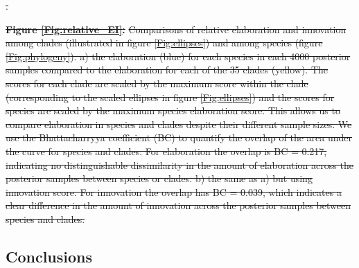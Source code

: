 \documentclass[12pt,letterpaper]{article}
\providecommand{\DIFdeltex}[1]{{\protect\color{red}\sout{#1}}}                      %
\providecommand{\DIFdelbegin}{} %
\providecommand{\DIFdelend}{} %
\providecommand{\DIFdelFL}[1]{\DIFdel{#1}} %
\providecommand{\DIFdel}[1]{\texorpdfstring{\DIFdeltex{#1}}{}} %
\newcommand{\DIFscaledelfig}{0.5}
\newlength{\DIFdelgraphicswidth} %
\newlength{\DIFdelgraphicsheight} %
\newcommand{\DIFdelincludegraphics}[2][]{%
\sbox{\DIFdelgraphicsbox}{\DIFOincludegraphics[#1]{#2}}%
\settoboxwidth{\DIFdelgraphicswidth}{\DIFdelgraphicsbox} %
\settoboxtotalheight{\DIFdelgraphicsheight}{\DIFdelgraphicsbox} %
\scalebox{\DIFscaledelfig}{%
\parbox[b]{\DIFdelgraphicswidth}{\usebox{\DIFdelgraphicsbox}\\[-\baselineskip] \rule{\DIFdelgraphicswidth}{0em}}\llap{\resizebox{\DIFdelgraphicswidth}{\DIFdelgraphicsheight}{%
\setlength{\unitlength}{\DIFdelgraphicswidth}%
\begin{picture}(1,1)%
\thicklines\linethickness{2pt} %
{\color[rgb]{1,0,0}\put(0,0){\framebox(1,1){}}}%
{\color[rgb]{1,0,0}\put(0,0){\line( 1,1){1}}}%
{\color[rgb]{1,0,0}\put(0,1){\line(1,-1){1}}}%
\end{picture}%
}\hspace*{3pt}}} %
} %
\DeclareRobustCommand{\DIFdelbegin}{\DIFOdelbegin \let\includegraphics\DIFdelincludegraphics} %
\DeclareRobustCommand{\DIFdelend}{\DIFOaddend \let\includegraphics\DIFOincludegraphics} %
\begin{document}
\DIFdelbegin %
{%
\DIFdelFL{.}}


\textbf{\DIFdel{Figure \ref{Fig:relative_EI}:}} %
\DIFdel{Comparisons of relative elaboration and innovation among clades (illustrated in figure \ref{Fig:ellipses}) and among species (figure \ref{Fig:phylogeny}).
a) the elaboration (blue) for each species in each 4000 posterior samples compared to the elaboration for each of the 35 clades (yellow).
The scores for each clade are scaled by the maximum score within the clade (corresponding to the scaled ellipses in figure \ref{Fig:ellipses}) and the scores for species are scaled by the maximum species elaboration score.
This allows us to compare elaboration in species and clades despite their different sample sizes.
We use the Bhattacharryya coefficient (BC) to quantify the overlap of the area under the curve for species and clades. 
For elaboration the overlap is BC = 0.217, indicating no distinguishable dissimilarity in the amount of elaboration across the posterior samples between species or clades. 
b) the same as a) but using innovation score. 
For innovation the overlap has BC = 0.039, which indicates a clear difference in the amount of innovation across the posterior samples between species and clades. }%

\DIFdelend \subsection{Conclusions}
\DIFdelbegin %
\end{document}
